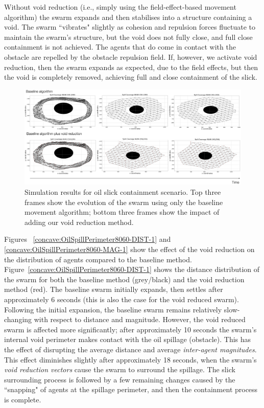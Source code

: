 \documentclass[letterpaper]{article}
\begin{document}
Without void reduction (i.e., simply using the field-effect-based movement algorithm) the swarm expands and then stabilises into a structure containing a void.  The swarm ``vibrates" slightly as cohesion and repulsion forces fluctuate to maintain the swarm's structure, but the void does not fully close, and full close containment is not achieved. The agents that do come in contact with the obstacle are repelled by the obstacle repulsion field. If, however, we activate void reduction, then the swarm expands as expected, due to the field effects, but then the void is completely removed, achieving full and close containment of the slick.

\begin{figure}
  \includegraphics[width=\textwidth]{figures/spillresults}
  \caption{Simulation results for oil slick containment scenario. Top three frames show the evolution of the swarm using only the baseline movement algorithm; bottom three frames show the impact of adding our void reduction method.}
  \label{spillresults}
\end{figure}


Figures ~\ref{concave:OilSpillPerimeter8060-DIST-1} and \ref{concave:OilSpillPerimeter8060-MAG-1} show the effect of the void reduction on the distribution of agents compared to the baseline method. Figure~\ref{concave:OilSpillPerimeter8060-DIST-1} shows the distance distribution of the swarm for both the baseline method (grey/black) and the void reduction method (red). The baseline swarm initially expands, then settles after approximately 6 seconds (this is also the case for the void reduced swarm). Following the initial expansion, the baseline swarm remains relatively slow-changing with respect to distance and magnitude. However, the void reduced swarm is affected more significantly; after approximately 10 seconds the swarm's internal void perimeter makes contact with the oil spillage (obstacle). This has the effect of disrupting the average distance and average \textit{inter-agent magnitudes}. This effect diminishes slightly after approximately 18 seconds, when the swarm's \textit{void reduction vectors} cause the swarm to surround the spillage. The slick surrounding process is followed by a few remaining changes caused by the ``snapping" of agents at the spillage perimeter, and then the containment process is complete.
\end{document}
